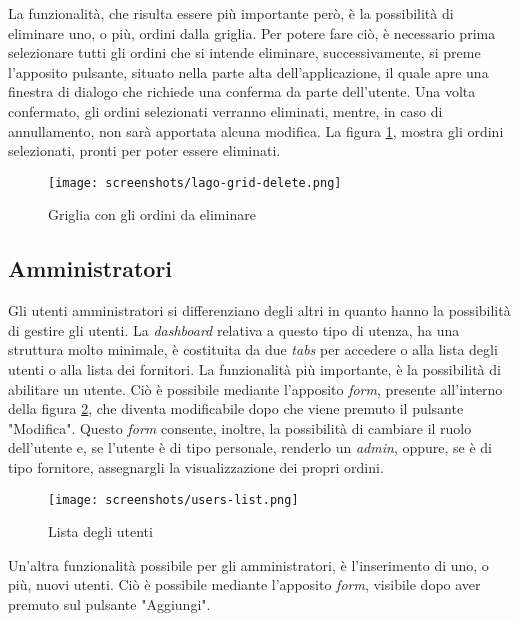 La funzionalità, che risulta essere più importante però, è la possibilità di eliminare uno, o più, ordini dalla griglia.
Per potere fare ciò, è necessario prima selezionare tutti gli ordini che si intende eliminare, successivamente, si preme l'apposito pulsante, situato nella parte alta dell'applicazione, il quale apre una finestra di dialogo che richiede una conferma da parte dell'utente.
Una volta confermato, gli ordini selezionati verranno eliminati, mentre, in caso di annullamento, non sarà apportata alcuna modifica.
La figura \ref{fig:lago-grid-delete}, mostra gli ordini selezionati, pronti per poter essere eliminati.

\begin{figure}[!ht]
  \begin{center}
    \texttt{[image: screenshots/lago-grid-delete.png]}
    \caption{Griglia con gli ordini da eliminare}
    \label{fig:lago-grid-delete}
  \end{center}
\end{figure}

\subsection{Amministratori}
Gli utenti amministratori si differenziano degli altri in quanto hanno la possibilità di gestire gli utenti.
La \emph{dashboard} relativa a questo tipo di utenza, ha una struttura molto minimale, è costituita da due \emph{tabs} per accedere o alla lista degli utenti o alla lista dei fornitori.
La funzionalità più importante, è la possibilità di abilitare un utente. 
Ciò è possibile mediante l'apposito \emph{form}, presente all'interno della figura \ref{fig:users-list}, che diventa modificabile dopo che viene premuto il pulsante "Modifica".
Questo \emph{form} consente, inoltre, la possibilità di cambiare il ruolo dell'utente e, se l'utente è di tipo personale, renderlo un \emph{admin}, oppure, se è di tipo fornitore, assegnargli la visualizzazione dei propri ordini.

\begin{figure}[!ht]
  \begin{center}
    \texttt{[image: screenshots/users-list.png]}
    \caption{Lista degli utenti}
    \label{fig:users-list}
  \end{center}
\end{figure}

Un'altra funzionalità possibile per gli amministratori, è l'inserimento di uno, o più, nuovi utenti.
Ciò è possibile mediante l'apposito \emph{form}, visibile dopo aver premuto sul pulsante "Aggiungi".